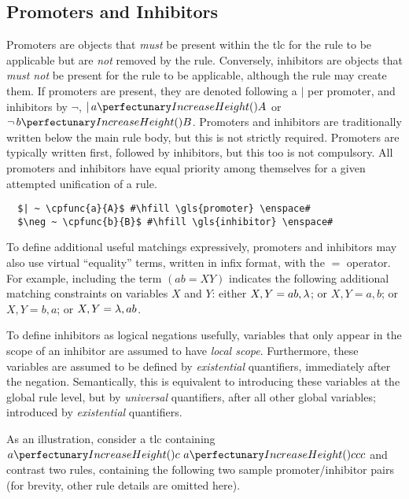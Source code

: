 \subsection{\label{sec:cps:prominhi}Promoters and Inhibitors}

Promoters are objects that \emph{must} be present within the \gls{tlc} for the rule to be applicable but are \emph{not} removed by the rule.  Conversely, \glspl{inhibitor} are objects that \emph{must not} be present for the rule to be applicable, although the rule may create them.  If \glspl{promoter} are present, they are denoted following a \(|\) per \gls{promoter}, and \glspl{inhibitor} by \(\neg\), \eg{} \(|\,\cpfunc{a}{A}\) or \(\neg\,\cpfunc{b}{B}\).  Promoters and \glspl{inhibitor} are traditionally written below the main rule body, but this is not strictly required.  Promoters are typically written first, followed by \glspl{inhibitor}, but this too is not compulsory.  All \glspl{promoter} and \glspl{inhibitor} have equal priority among themselves for a given attempted unification of a rule.

\lstset{xleftmargin=.5in, xrightmargin=.5in} 
\begin{lstlisting}
  $| ~ \cpfunc{a}{A}$ #\hfill \gls{promoter} \enspace#
  $\neg ~ \cpfunc{b}{B}$ #\hfill \gls{inhibitor} \enspace#
\end{lstlisting}

To define additional useful matchings expressively, 
\glspl{promoter} and \glspl{inhibitor} may also use virtual ``equality'' terms, 
written in infix format, with the \(=\) operator.
For example, including the term \((ab = XY)\) indicates the following additional matching constraints on variables \(X\) and \(Y\): either \(X, Y = ab, \lambda\); or \(X, Y = a, b\); or \(X, Y = b, a\); or \(X, Y = \lambda, ab\).

To define \glspl{inhibitor} as logical negations usefully,
variables that only appear in the scope of an \gls{inhibitor} are assumed to have \emph{local scope}. 
Furthermore, these variables are assumed to be defined by \emph{existential} quantifiers, immediately after the negation. 
Semantically, this is equivalent to introducing these variables at the global rule level, 
but by \emph{universal} quantifiers, after all other global variables;
introduced by \emph{existential} quantifiers.

As an illustration, consider a \gls{tlc} containing \(\cpfunc{a}{c} ~ \cpfunc{a}{ccc}\) and contrast two rules, 
containing the following two sample \gls{promoter}/\gls{inhibitor} pairs 
(for brevity, other rule details are omitted here).

